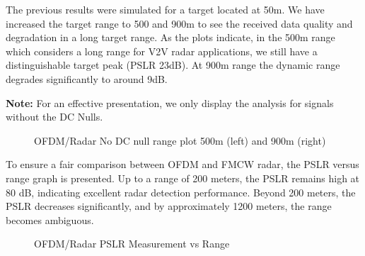 \documentclass[conference]{IEEEtran}
\begin{document}
The previous results were simulated for a target located at 50m. We have increased the target range to 500 and 900m to see the received data quality and degradation in a long target range. As the plots indicate, in the 500m range which considers a long range for V2V radar applications, we still have a distinguishable target peak (PSLR 23dB). At 900m range the dynamic range degrades significantly to around 9dB. \par
\textbf{ Note: } For an effective presentation, we only display the analysis for signals without the DC Nulls.


\begin{figure}[H]
\centering
{}
\caption{OFDM/Radar No DC null range plot 500m (left) and 900m (right)}
\end{figure} 

To ensure a fair comparison between OFDM and FMCW radar, the PSLR versus range graph is presented. Up to a range of 200 meters, the PSLR remains high at 80 dB, indicating excellent radar detection performance. Beyond 200 meters, the PSLR decreases significantly, and by approximately 1200 meters, the range becomes ambiguous.

\begin{figure}[H]
\centering
{}
\caption{OFDM/Radar PSLR Measurement vs Range}
\end{figure} 
\end{document}
